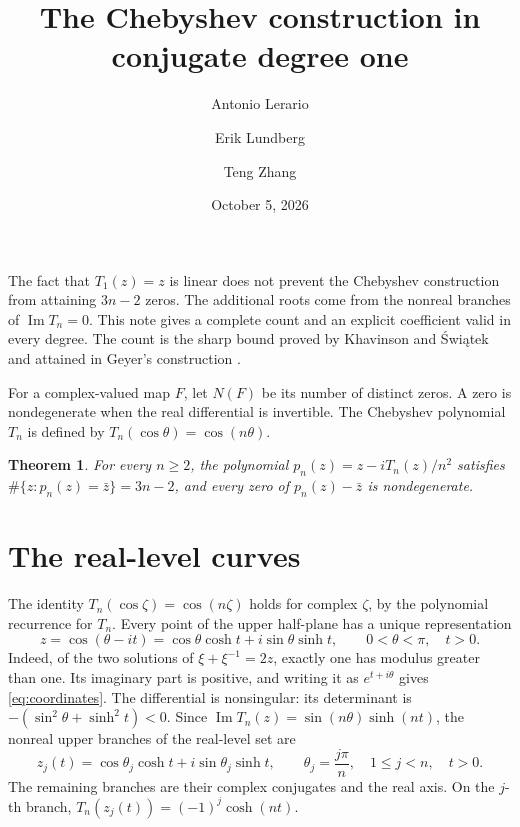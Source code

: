 \documentclass[a4paper]{amsart}
\title[The Chebyshev example in conjugate degree one]{The Chebyshev construction in conjugate degree one}
\author{Antonio Lerario}
\author{Erik Lundberg}
\author{Teng Zhang}
\date{October 5, 2026}
\newtheorem{thm}{Theorem}
\theoremstyle{remark}
\DeclareMathOperator{\Ima}{Im}
\begin{document}
\maketitle

The fact that \(T_1(z)=z\) is linear does not prevent the Chebyshev
construction from attaining \(3n-2\) zeros. The additional roots
come from the nonreal branches of \(\Ima T_n=0\). This note gives
a complete count and an explicit coefficient valid in every degree.
The count is the sharp bound proved by Khavinson and
\'{S}wi\k{a}tek \cite{KS03} and attained in Geyer's construction
\cite{Gey08}.

For a complex-valued map \(F\), let \(N(F)\) be its number of distinct
zeros. A zero is nondegenerate when the real differential is invertible.
The Chebyshev polynomial \(T_n\) is defined by
\(T_n(\cos\theta)=\cos(n\theta)\).

\begin{thm}\label{cor:explicit}
For every \(n\ge2\), the polynomial
\(p_n(z)=z-iT_n(z)/n^2\) satisfies
\(\#\{z:p_n(z)=\bar z\}=3n-2\), and every zero of
\(p_n(z)-\bar z\) is nondegenerate.
\end{thm}

\section{The real-level curves}
The identity \(T_n(\cos\zeta)=\cos(n\zeta)\) holds for complex
\(\zeta\), by the polynomial recurrence for \(T_n\).
Every point of the upper half-plane has a unique representation
\begin{equation}\label{eq:coordinates}
 z=\cos(\theta-it)=\cos\theta\cosh t+i\sin\theta\sinh t,
 \qquad 0<\theta<\pi,\quad t>0.
\end{equation}
Indeed, of the two solutions of \(\xi+\xi^{-1}=2z\), exactly one
has modulus greater than one. Its imaginary part is positive,
and writing it as \(e^{t+i\theta}\) gives \eqref{eq:coordinates}.
The differential is nonsingular: its determinant is
\(-(\sin^2\theta+\sinh^2t)<0\).
Since \(\Ima T_n(z)=\sin(n\theta)\sinh(nt)\), the nonreal upper
branches of the real-level set are
\begin{equation}\label{eq:branches}
 z_j(t)=\cos\theta_j\cosh t+i\sin\theta_j\sinh t,\qquad
 \theta_j=\frac{j\pi}{n},\quad 1\le j<n,\quad t>0.
\end{equation}
The remaining branches are their complex conjugates and the real
axis. On the \(j\)-th branch, \(T_n(z_j(t))=(-1)^j\cosh(nt)\).
\end{document}
